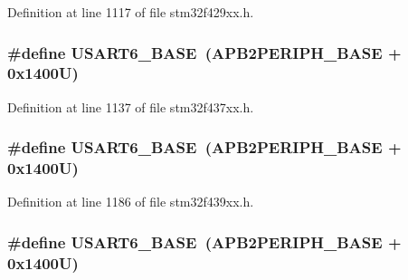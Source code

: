 Definition at line 1117 of file stm32f429xx.\+h.

\subsubsection[{\texorpdfstring{U\+S\+A\+R\+T6\+\_\+\+B\+A\+SE}{USART6_BASE}}]{\setlength{\rightskip}{0pt plus 5cm}\#define U\+S\+A\+R\+T6\+\_\+\+B\+A\+SE~({\bf A\+P\+B2\+P\+E\+R\+I\+P\+H\+\_\+\+B\+A\+SE} + 0x1400\+U)}\hypertarget{group___peripheral__memory__map_gade4d3907fd0387ee832f426f52d568bb}{}\label{group___peripheral__memory__map_gade4d3907fd0387ee832f426f52d568bb}


Definition at line 1137 of file stm32f437xx.\+h.

\subsubsection[{\texorpdfstring{U\+S\+A\+R\+T6\+\_\+\+B\+A\+SE}{USART6_BASE}}]{\setlength{\rightskip}{0pt plus 5cm}\#define U\+S\+A\+R\+T6\+\_\+\+B\+A\+SE~({\bf A\+P\+B2\+P\+E\+R\+I\+P\+H\+\_\+\+B\+A\+SE} + 0x1400\+U)}\hypertarget{group___peripheral__memory__map_gade4d3907fd0387ee832f426f52d568bb}{}\label{group___peripheral__memory__map_gade4d3907fd0387ee832f426f52d568bb}


Definition at line 1186 of file stm32f439xx.\+h.

\subsubsection[{\texorpdfstring{U\+S\+A\+R\+T6\+\_\+\+B\+A\+SE}{USART6_BASE}}]{\setlength{\rightskip}{0pt plus 5cm}\#define U\+S\+A\+R\+T6\+\_\+\+B\+A\+SE~({\bf A\+P\+B2\+P\+E\+R\+I\+P\+H\+\_\+\+B\+A\+SE} + 0x1400\+U)}\hypertarget{group___peripheral__memory__map_gade4d3907fd0387ee832f426f52d568bb}{}\label{group___peripheral__memory__map_gade4d3907fd0387ee832f426f52d568bb}


